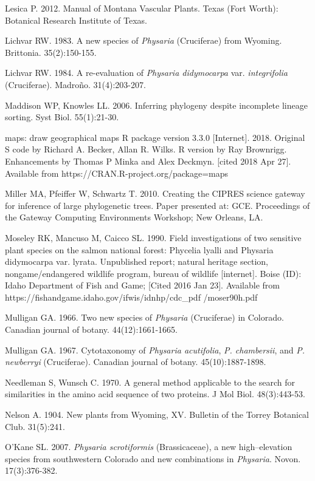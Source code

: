 Lesica P. 2012. Manual of Montana Vascular Plants. Texas (Fort Worth): Botanical Research Institute of Texas.

Lichvar RW. 1983. A new species of \textit{Physaria} (Cruciferae) from Wyoming.  Brittonia. 35(2):150-155.

Lichvar RW. 1984. A re-evaluation of \textit{Physaria didymocarpa} var. \textit{integrifolia} (Cruciferae). Madroño. 31(4):203-207.

Maddison WP, Knowles LL. 2006. Inferring phylogeny despite incomplete lineage sorting. Syst Biol. 55(1):21-30.

maps: draw geographical maps R package version 3.3.0 [Internet]. 2018. Original S code by Richard A. Becker, Allan R. Wilks. R version by Ray Brownrigg. Enhancements by Thomas P Minka and Alex Deckmyn. [cited 2018 Apr 27]. Available from https://CRAN.R-project.org/package=maps 

Miller MA, Pfeiffer W, Schwartz T. 2010. Creating the CIPRES science gateway for inference of large phylogenetic trees. Paper presented at: GCE. Proceedings of the Gateway Computing Environments Workshop; New Orleans, LA.

Moseley RK, Mancuso M, Caicco SL. 1990. Field investigations of two sensitive plant species on the salmon national forest: Phycelia lyalli and Physaria didymocarpa var. lyrata. Unpublished report; natural heritage section, nongame/endangered wildlife program, bureau of wildlife [internet]. Boise (ID): Idaho Department of Fish and Game; [Cited 2016 Jan 23]. Available from https://fishandgame.idaho.gov/ifwis/idnhp/cdc\_pdf /moser90h.pdf

Mulligan GA. 1966. Two new species of \textit{Physaria} (Cruciferae) in Colorado. Canadian journal of botany. 44(12):1661-1665.

Mulligan GA. 1967. Cytotaxonomy of \textit{Physaria acutifolia}, \textit{P. chambersii}, and \textit{P. newberryi} (Cruciferae). Canadian journal of botany. 45(10):1887-1898.

Needleman S, Wunsch C.  1970. A general method applicable to the search for similarities in the amino acid sequence of two proteins. J Mol Biol. 48(3):443-53.

Nelson A. 1904. New plants from Wyoming, XV. Bulletin of the Torrey Botanical Club. 31(5):241.

O’Kane SL. 2007. \textit{Physaria scrotiformis} (Brassicaceae), a new high–elevation species from southwestern Colorado and new combinations in \textit{Physaria}. Novon. 17(3):376-382.

